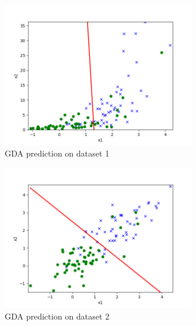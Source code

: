 \begin{answer}
    \begin{figure}[H]
        \centering
        \includegraphics[width=0.75\textwidth]{../src/linearclass/gda_pred_1.png}
        \caption{GDA prediction on dataset 1}
        \label{fig:gda_pred_1}
    \end{figure}
    \begin{figure}[H]
        \centering
        \includegraphics[width=0.75\textwidth]{../src/linearclass/gda_pred_2.png}
        \caption{GDA prediction on dataset 2}
        \label{fig:gda_pred_2}
    \end{figure}
\end{answer}
